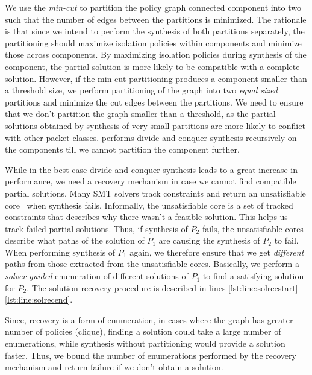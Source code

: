 We use the \emph{min-cut} to partition the policy graph
connected component into two such that the number of 
edges between the partitions is
minimized. The rationale  is that since we intend
to perform the synthesis of both partitions separately, the partitioning
should maximize  isolation policies within components and minimize those
across components. By maximizing isolation policies during synthesis
of the component, the partial solution is more likely to be compatible
with a complete solution. However, if the min-cut partitioning
produces a component smaller than a threshold size, we perform
partitioning of the graph into two \emph{equal sized} partitions and
minimize the cut edges between the partitions. We need to ensure
that we don't partition the graph smaller than a threshold, as the
partial solutions obtained by synthesis of very small partitions are
more likely to conflict with other packet classes. \Name 
performs divide-and-conquer synthesis recursively on the
components till we cannot partition the component further.

While in the best case divide-and-conquer synthesis  leads to a great
increase in performance, we need a recovery mechanism in case we cannot find
compatible partial solutions. Many SMT solvers track constraints and return
an unsatisfiable core~\cite{unsatcores} when synthesis fails. Informally,
the unsatisfiable
core is a set of tracked constraints
 that describes why there wasn't a feasible 
solution. This helps us track failed partial solutions. 
Thus, if synthesis of $P_2$ fails, the unsatisfiable cores
describe what paths of the solution of $P_1$ are
causing the synthesis of $P_2$ to fail. 
When performing synthesis of $P_1$
again, we therefore ensure that we get \emph{different} paths 
from those extracted from the 
unsatisfiable cores.  Basically, we perform a 
\emph{solver-guided} enumeration of different solutions of $P_1$ to
find a satisfying solution for $P_2$. 
The solution recovery procedure is described in lines \ref{lst:line:solrecstart}-
\ref{lst:line:solrecend}.

Since, recovery is a 
form of enumeration, in cases where the graph has greater number of policies 
(clique), finding a solution could take a large number of enumerations,
while synthesis without partitioning would provide a solution faster. 
Thus, we bound the number of enumerations performed by the 
recovery mechanism and return failure
if we don't obtain a solution. 

